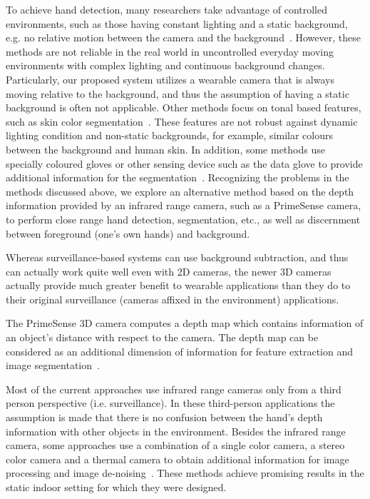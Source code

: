 To achieve hand detection, many researchers take advantage of controlled environments, such as those having constant lighting and a static background, e.g. no relative motion between the camera and the
background~\cite{imagawa1998color, hong2000gesture}. However, these methods are not reliable in the real world in uncontrolled everyday moving environments with complex lighting and continuous
background changes. Particularly, our proposed system utilizes a wearable camera that is always moving relative to the background, and thus the assumption of having a static background is often not applicable. Other methods focus on tonal based features, such as skin color segmentation~\cite{kjeldsen1996toward}. These features are not robust against dynamic lighting condition and non-static backgrounds, for example, similar colours between the background and human skin. In addition, some methods use specially coloured gloves or other sensing device such as the data glove to provide additional information for the segmentation~\cite{sturman1994survey}.
Recognizing the problems in the methods discussed above, we explore an alternative method based on the depth information provided by an infrared range camera, such as a PrimeSense camera, to perform close range hand
detection, segmentation, etc., as well as discernment between foreground (one's own hands) and background.

Whereas surveillance-based systems can use background subtraction, and thus can actually work quite well even with 2D cameras, the newer 3D cameras actually provide much greater benefit to wearable applications than they do to their original surveillance (cameras affixed in the environment) applications.

The PrimeSense 3D camera computes a depth map which contains information of an object's distance with respect to the camera. The depth map can be considered as an additional dimension of information for feature extraction
and image segmentation~\cite{ren2011robust, uebersax2011real}.

Most of the current approaches use infrared range cameras only from a third person
perspective (i.e. surveillance). In these third-person applications the assumption is made that there is no confusion between the hand's depth information with other objects in the environment. Besides the infrared range camera, some approaches use a combination of a single color camera, a stereo color camera and a thermal camera to obtain additional information for image processing and image de-noising~\cite{appenrodt2010data}. These methods achieve promising results in the static indoor setting for which they were designed.

